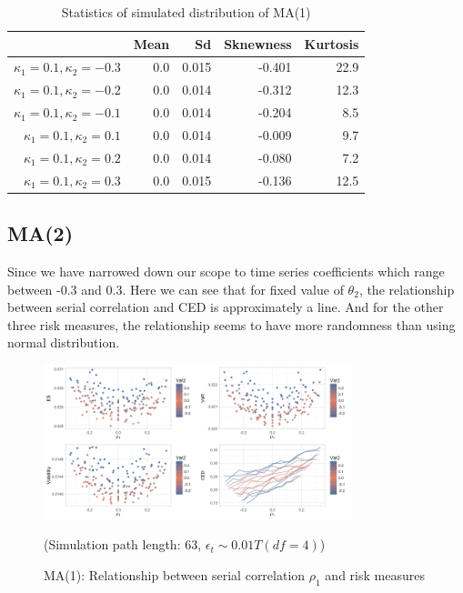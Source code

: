 \documentclass[11pt]{article}
\begin{document}
\begin{table}[H]
\centering
\begin{tabular}{|r |r r r r|}
\hline
& Mean & Sd & Sknewness & Kurtosis \\
\hline
$\kappa_1 = 0.1, \kappa_2 = -0.3$ & 0.0 & 0.015 & -0.401 & 22.9\\
$\kappa_1 = 0.1, \kappa_2 = -0.2$ & 0.0 & 0.014 & -0.312 & 12.3\\
$\kappa_1 = 0.1, \kappa_2 = -0.1$ & 0.0 & 0.014 & -0.204 & 8.5\\
$\kappa_1 = 0.1, \kappa_2 = 0.1$ & 0.0 & 0.014 & -0.009 & 9.7\\
$\kappa_1 = 0.1, \kappa_2 = 0.2$ & 0.0 & 0.014 & -0.080 & 7.2\\
$\kappa_1 = 0.1, \kappa_2 = 0.3$ & 0.0 & 0.015 & -0.136 & 12.5\\
\hline
\end{tabular}
\caption{Statistics of simulated distribution of MA(1)}
\label{table: T_dist_MA1_return}
\end{table}

\subsection{MA(2)}

Since we have narrowed down our scope to time series coefficients which range between -0.3 and 0.3. Here we can see that for fixed value of $\theta_2$, the relationship between serial correlation and CED is approximately a line. And for the other three risk measures, the relationship seems to have more randomness than using normal distribution. 

\begin{figure}[H]
\centering
\includegraphics[width = 0.8\textwidth]{../figures/simulation/T_dist_MA2_risk_measures}
\caption{MA(1): Relationship between serial correlation $\rho_1$ and risk measures}
(Simulation path length: 63, $\epsilon_t \sim 0.01T(df = 4)$)
\label{fig:T_dist_MA2_risk_measures}
\end{figure}
\end{document}
